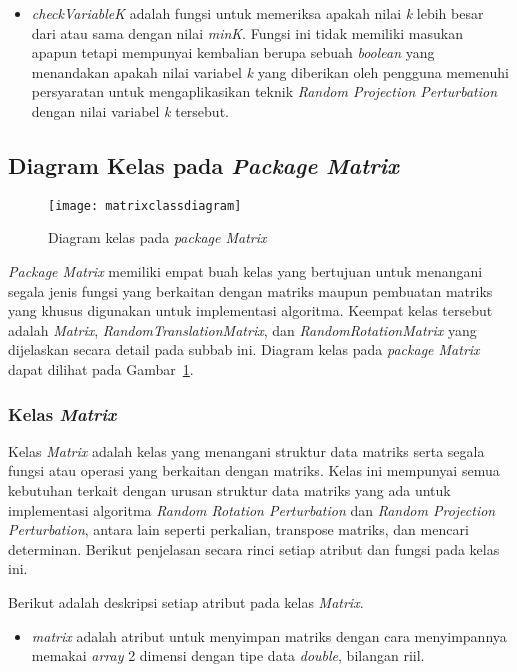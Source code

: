 \begin{itemize}
	\item \textit{checkVariableK} adalah fungsi untuk memeriksa apakah nilai \textit{k} lebih besar dari atau sama dengan nilai \textit{minK}. Fungsi ini tidak memiliki masukan apapun tetapi mempunyai kembalian berupa sebuah \textit{boolean} yang menandakan apakah nilai variabel \textit{k} yang diberikan oleh pengguna memenuhi persyaratan untuk mengaplikasikan teknik \textit{Random Projection Perturbation} dengan nilai variabel \textit{k} tersebut.
\end{itemize}

\subsection{Diagram Kelas pada \textit{Package Matrix}}
\label{subsec:diagram-kelas-matrix}

\begin{figure}
	\centering
	\texttt{[image: matrixclassdiagram]}
	\caption{Diagram kelas pada \textit{package Matrix}}
	\label{fig:matrixclassdiagram}
\end{figure}

\textit{Package Matrix} memiliki empat buah kelas yang bertujuan untuk menangani segala jenis fungsi yang berkaitan dengan matriks maupun pembuatan matriks yang khusus digunakan untuk implementasi algoritma. Keempat kelas tersebut adalah \textit{Matrix}, \textit{RandomTranslationMatrix}, dan \textit{RandomRotationMatrix} yang dijelaskan secara detail pada subbab ini. Diagram kelas pada \textit{package Matrix} dapat dilihat pada Gambar~\ref{fig:matrixclassdiagram}.

\subsubsection{Kelas \textit{Matrix}}
\label{subsubsec:kelas-matrix}

Kelas \textit{Matrix} adalah kelas yang menangani struktur data matriks serta segala fungsi atau operasi yang berkaitan dengan matriks. Kelas ini mempunyai semua kebutuhan terkait dengan urusan struktur data matriks yang ada untuk implementasi algoritma \textit{Random Rotation Perturbation} dan \textit{Random Projection Perturbation}, antara lain seperti perkalian, transpose matriks, dan mencari determinan. Berikut penjelasan secara rinci setiap atribut dan fungsi pada kelas ini.

Berikut adalah deskripsi setiap atribut pada kelas \textit{Matrix}.
\begin{itemize}
	\item \textit{matrix} adalah atribut untuk menyimpan matriks dengan cara menyimpannya memakai \textit{array} 2 dimensi dengan tipe data \textit{double}, bilangan riil.
\end{itemize}

